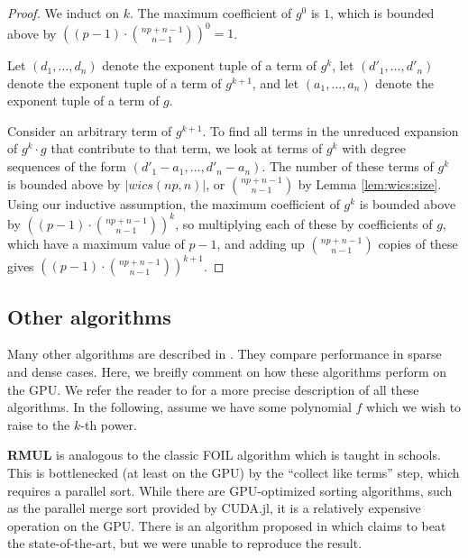 \begin{proof}
    We induct on $k$. The maximum coefficient of $g^0$ is $1$, which is bounded above by $((p - 1) \cdot \binom{np + n - 1}{n - 1}) ^ 0 = 1$.
    
    Let $(d_1, \dots , d_n)$ denote the exponent tuple of a term of $g^k$, let $(d'_1, \dots , d'_n)$ denote the exponent tuple of a term of $g^{k + 1}$, and let $(a_1, \dots , a_n)$ denote the exponent tuple of a term of $g$.

    Consider an arbitrary term of $g^{k + 1}$. To find all terms in the unreduced expansion of $g^k \cdot g$ that contribute to that term, we look at terms of $g^k$ with degree sequences of the form $(d'_1 - a_1, \dots , d'_n - a_n)$. The number of these terms of $g^k$ is bounded above by $|wics(np, n)|$, or $\binom{np + n - 1}{n - 1}$ by Lemma \ref{lem:wics:size}. Using our inductive assumption, the maximum coefficient of $g^k$ is bounded above by $((p - 1) \cdot \binom{np + n - 1}{n - 1}) ^ k$, so multiplying each of these by coefficients of $g$, which have a maximum value of $p - 1$, and adding up $\binom{np + n - 1}{n - 1}$ copies of these gives $((p - 1) \cdot \binom{np + n - 1}{n - 1}) ^ {k + 1}$.
\end{proof}


\subsection{Other algorithms}

Many other algorithms are described in \cite{monagan-2012-sparse-powering}. 
They compare performance in sparse and dense cases. 
Here, we breifly comment on how these algorithms perform on the GPU.
We refer the reader to \cite{monagan-2012-sparse-powering}
for a more precise description of all these algorithms.
In the following, assume we have some polynomial \(f\) which we wish 
to raise to the \(k\)-th power.

\textbf{RMUL} is analogous to the classic FOIL algorithm which is taught in schools. 
This is bottlenecked (at least on the GPU) by the ``collect like terms'' step, 
which requires a parallel sort.
While there are GPU-optimized sorting algorithms, such as the parallel merge sort
provided by CUDA.jl, it is a relatively expensive operation on the GPU.
There is an algorithm proposed in \cite{gupta-2023-gpu-sort}
which claims to beat the state-of-the-art, but we were unable to reproduce the result.


